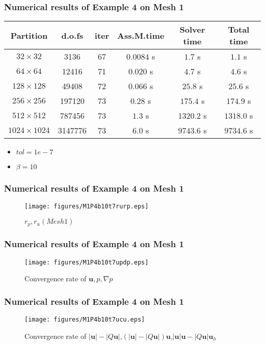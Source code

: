 \documentclass[notheorems,serif]{beamer}
\begin{document}
\begin{frame}
\frametitle{Numerical results of Example 4 on Mesh 1}
\begin{tabular}{ |c|c|c|c|c|c| }   
\hline   
Partition & d.o.fs & iter & Ass.M.time & Solver time & Total time \\
\hline
$32\times 32$ & 3136 & 67 & $0.0084$ s & $1.7$ s & $1.1$ s \\
$64\times 64$ & 12416 & 71 & $0.020$ s & $4.7$ s & $4.6$ s \\
$128\times 128$ & 49408 & 72 & $0.066$ s & $25.8$ s & $25.6$ s \\
$256\times 256$ & 197120 & 73 & $0.28$ s & $175.4$ s & $174.9$ s \\
$512\times 512$ & 787456 & 73 & $1.3$ s & $1320.2$ s & $1318.0$ s \\
$1024\times 1024$ & 3147776 & 73 & $6.0$ s & $9743.6$ s & $9734.6$ s \\
\hline 
\end{tabular}
\smallskip
\begin{itemize}
\item $tol = 1e-7$
\item $\beta = 10$
\end{itemize}
\end{frame}

\begin{frame}
\frametitle{Numerical results of Example 4 on Mesh 1}
\begin{figure}[H] 
\centering 
\texttt{[image: figures/M1P4b10t7rurp.eps]} 
\caption{$r_p, r_u(Mesh 1)$}
\label{fig:rpmesh1p4}
\end{figure}
\end{frame}

\begin{frame}
\frametitle{Numerical results of Example 4 on Mesh 1}
\begin{figure}[H] 
\centering 
\texttt{[image: figures/M1P4b10t7updp.eps]} 
\caption{Convergence rate of $\boldsymbol{u}, p, \nabla p$}
\label{fig:upmesh1p4} 
\end{figure}
\end{frame}

\begin{frame}
\frametitle{Numerical results of Example 4 on Mesh 1}
\begin{figure}[H] 
\centering 
\texttt{[image: figures/M1P4b10t7ucu.eps]} 
\caption{Convergence rate of $\left|\boldsymbol{u}\right|-\left|Q\boldsymbol{u}\right|$,$(\left|\boldsymbol{u}\right|-\left|Q\boldsymbol{u}\right|)\boldsymbol{u}$,$\left|\boldsymbol{u}\right|\boldsymbol{u}-\left|Q\boldsymbol{u}\right|\boldsymbol{u}_h$}
\label{fig:normumesh1p4} 
\end{figure}
\end{frame}
\end{document}

